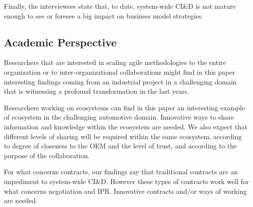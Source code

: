 Finally, the interviewees state that, to date, system-wide CI\&D is not mature enough to see or foresee a big impact on business model strategies. 

\subsection{Academic Perspective}

Researchers that are interested in scaling agile methodologies to the entire organization or to inter-organizational collaborations might find in this paper interesting findings coming from an industrial project in a challenging domain that is witnessing a profound transformation in the last years. 

Researchers working on ecosystems can find in this paper an interesting example of ecosystem in the challenging automotive domain. Innovative ways to share information and knowledge within the ecosystem are needed. %
We also expect that different levels of sharing will be required within the same ecosystem, according to degree of closeness to the OEM and the level of trust, and according to the purpose of the collaboration.

For what concerns contracts, our findings say that traditional contracts are an impediment to system-wide CI\&D. However these types of contracts work well for what concerns negotiation and IPR. Innovative contracts and/or ways of working are needed.

% 






